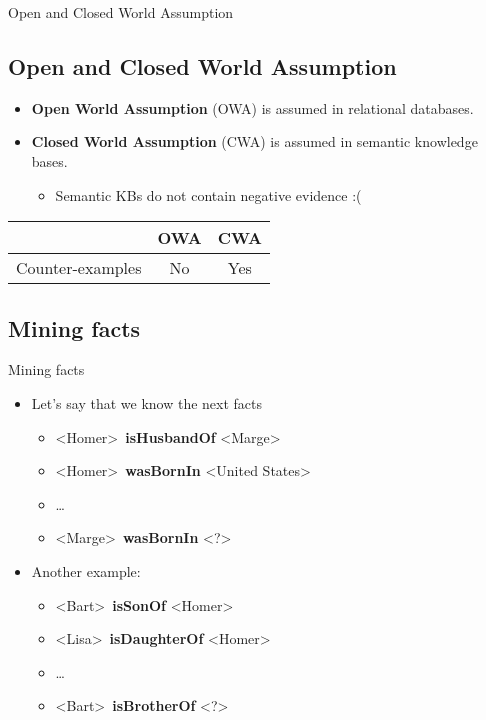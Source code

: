 \documentclass[xcolor={x11names}]{beamer}
\begin{document}
\begin{frame}{Open and Closed World Assumption}
\subsection{Open and Closed World Assumption}

\begin{itemize}
    \item \textbf{Open World Assumption} (OWA) is assumed in relational databases.
    \item \textbf{Closed World Assumption} (CWA) is assumed in semantic knowledge bases.
        \begin{itemize}
            \item Semantic KBs do not contain negative evidence :(
        \end{itemize}
\end{itemize}

\begin{tabular}{ l | c | c }
    \toprule
    & OWA & CWA \\
    \midrule
    Counter-examples & No & Yes \\
    \bottomrule
\end{tabular}
\end{frame}

\subsection{Mining facts}
\begin{frame}{Mining facts}
\begin{itemize}
   \item Let’s say that we know the next facts
   \begin{itemize}
   		\item \textless Homer\textgreater\  \textbf{isHusbandOf} \textless Marge\textgreater\
        \item \textless Homer\textgreater\  \textbf{wasBornIn} \textless United States\textgreater\
        \item \ldots
        \item \textless Marge\textgreater\  \textbf{wasBornIn} \textless?\textgreater
   \end{itemize}
   \item Another example:
   \begin{itemize}
   		\item \textless Bart\textgreater\  \textbf{isSonOf} \textless Homer\textgreater
        \item \textless Lisa\textgreater\  \textbf{isDaughterOf} \textless Homer\textgreater
        \item \ldots
        \item \textless Bart\textgreater\  \textbf{isBrotherOf} \textless?\textgreater
   \end{itemize}
\end{itemize}
\end{frame}
\end{document}
